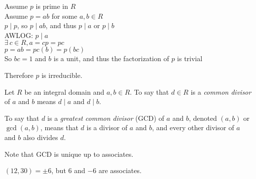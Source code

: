 \documentclass[letterpaper,12pt,fleqn]{article}
\begin{document}
\begin{theproof}
  Assume $p$ is prime in $R$ \\
  Assume $p=ab$ for some $a,b\in R$ \\
  $p\mid p$, so $p\mid ab$, and thus $p\mid a$ or $p\mid b$ \\
  AWLOG: $p\mid a$ \\
  $\exists\,c\in R,a=cp=pc$ \\
  $p=ab=pc(b)=p(bc)$ \\
  So $bc=1$ and $b$ is a unit, and thus the factorization of $p$ is trivial

  Therefore $p$ is irreducible.
\end{theproof}

\begin{definition}[GCD]
  Let $R$ be an integral domain and $a,b\in R$. To say that $d\in R$ is a
  \emph{common divisor} of $a$ and $b$ means $d\mid a$ and $d\mid b$.

  To say that $d$ is a \emph{greatest common divisor} (GCD) of $a$ and $b$, denoted
  $(a,b)$ or $\gcd(a,b)$, means that $d$ is a divisor of $a$ and $b$, and every other
  divisor of $a$ and $b$ also divides $d$.

  Note that GCD is unique up to associates.
\end{definition}

\begin{example}
  $(12,30)=\pm6$, but $6$ and $-6$ are associates.
\end{example}
\end{document}

